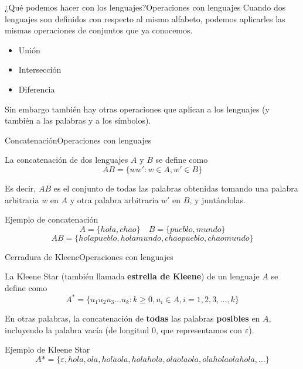 \documentclass[spanish, handout]{beamer}
\begin{document}
\begin{frame}{¿Qué podemos hacer con los lenguajes?}{Operaciones con lenguajes}
    Cuando dos lenguajes son definidos con respecto al mismo alfabeto, podemos aplicarles las mismas operaciones de conjuntos que ya conocemos. \pause
    
    \bigskip

    \begin{itemize}
        \itemsep1.5ex
        \item Unión \pause
        \item Intersección \pause
        \item Diferencia
    \end{itemize}

    \pause
    \bigskip

    Sin embargo también hay otras operaciones que aplican a los lenguajes (y también a las palabras y a los símbolos).
\end{frame}

\begin{frame}{Concatenación}{Operaciones con lenguajes}

    \begin{definition}
        La \alert{concatenación} de dos lenguajes $A$ y $B$ se define como
        \[AB = \{ww' : w \in A, w' \in B\}\]
    \end{definition} \pause

    \bigskip

    Es decir, $AB$ es el conjunto de todas las palabras obtenidas tomando una palabra arbitraria $w$ en $A$ y otra palabra arbitraria $w'$ en $B$, y juntándolas. \pause

    \bigskip

    \begin{exampleblock}{Ejemplo de concatenación}
        \[A = \{hola, chao\} \quad B = \{pueblo,  mundo\}\]
        \[AB = \{holapueblo, holamundo, chaopueblo, chaomundo\}\]
    \end{exampleblock}
\end{frame}

\begin{frame}{Cerradura de Kleene}{Operaciones con lenguajes}

    \begin{definition}
        La \alert{Kleene Star} (también llamada \textbf{estrella de Kleene}) de un lenguaje $A$ se define como
        \[A^{*} = \{u_1 u_2 u_3 \dots u_k : k \geq 0, u_i \in A, i = 1, 2, 3, \dots , k\}\]
    \end{definition} \pause
    
    \bigskip

    En otras palabras, la concatenación de \textbf{todas} las palabras \textbf{posibles} en $A$, incluyendo la \alert{palabra vacía} (de longitud 0, que representamos con $\varepsilon$). \pause

    \bigskip

    \begin{exampleblock}{Ejemplo de Kleene Star}
        \[A* = \{\varepsilon, hola, ola, holaola, holahola, olaolaola, olaholaolahola, \dots \}\]
    \end{exampleblock}
\end{frame}
\end{document}
